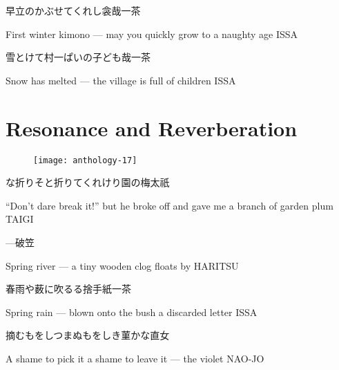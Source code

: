 \begin{haiku}
    {\FH 早立のかぶせてくれし衾哉}\hfill{\FH 一茶}

    \vin{} First winter kimono ---
    \vin{} \vin{} may you quickly grow to
    \vin{} \vin{} \vin{} a naughty age \hspace{\fill} ISSA
\end{haiku}

\begin{haiku}
    {\FH 雪とけて村一ぱいの子ども哉}\hfill{\FH 一茶}

    \vin{} Snow has melted ---
    \vin{} \vin{} the village is full
    \vin{} \vin{} \vin{} of children \hspace{\fill} ISSA
\end{haiku}

\chapter{Resonance and Reverberation}

\begin{figure}
    \texttt{[image: anthology-17]}
\end{figure}

\begin{haiku}
    {\FH な折りそと折りてくれけり園の梅}\hfill{\FH 太祇}

    \vin{} ``Don't dare break it!''
    \vin{} \vin{} but he broke off and gave me
    \vin{} \vin{} \vin{} a branch of garden plum \hspace{\fill} TAIGI
\end{haiku}

\begin{haiku}
    {---}\hfill{\FH 破笠}

    \vin{} Spring river ---
    \vin{} \vin{} a tiny wooden clog
    \vin{} \vin{} \vin{} floats by \hspace{\fill} HARITSU
\end{haiku}

\begin{haiku}
    {\FH 春雨や薮に吹るる捨手紙}\hfill{\FH 一茶}

    \vin{} Spring rain ---
    \vin{} \vin{} blown onto the bush
    \vin{} \vin{} \vin{} a discarded letter \hspace{\fill} ISSA
\end{haiku}

\begin{haiku}
    {\FH 摘むもをしつまぬもをしき菫かな}\hfill{\FH 直女}

    \vin{} A shame to pick it
    \vin{} \vin{} a shame to leave it ---
    \vin{} \vin{} \vin{} the violet \hspace{\fill} NAO-JO
\end{haiku}

